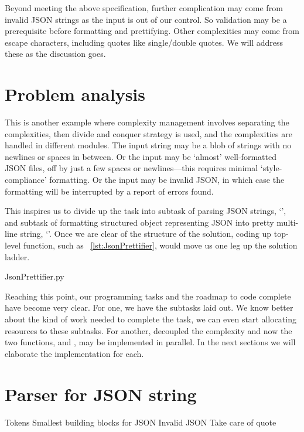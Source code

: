 Beyond meeting the above specification, further complication may come from invalid JSON strings
as the input is out of our control.
So validation may be a prerequisite before formatting and prettifying.
Other complexities may come from escape characters, including quotes like single/double quotes.
We will address these as the discussion goes.

\section{Problem analysis}\label{sec:outlineOfTheAlgorithm.Json}

This is another example where complexity management involves separating the complexities,
then divide and conquer strategy is used, and the complexities are handled in
different modules.
The input string may be a blob of strings with no newlines or spaces in between.
Or the input may be `almost' well-formatted JSON files, off by just a few spaces or
newlines---this requires minimal `style-compliance' formatting.
Or the input may be invalid JSON, in which case the formatting will be interrupted
by a report of errors found.

This inspires us to divide up the task into subtask of parsing JSON strings,
`', and subtask of formatting
structured object representing JSON into pretty multi-line string, `'.
Once we are clear of the structure of the solution, coding up top-level function,
such as ~\autoref{lst:JsonPrettifier}, would
move us one leg up the solution ladder.


{JsonPrettifier.py}

Reaching this point, our programming tasks and the roadmap to code complete have become very clear.
For one, we have the subtasks laid out.
We know better about the kind of work needed to complete the task, we can even start allocating
resources to these subtasks.
For another, decoupled the complexity and now the two functions, 
and , may be implemented in parallel.
In the next sections we will elaborate the implementation for each.

\section{Parser for JSON string}\label{sec:jsonparser}

Tokens
Smallest building blocks for JSON
Invalid JSON
Take care of quote


